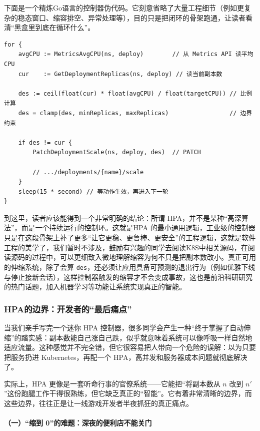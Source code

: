 下面是一个精炼Go语言的控制器伪代码。它刻意省略了大量工程细节（例如更复杂的稳态窗口、缩容排空、异常处理等），目的只是把闭环的骨架跑通，让读者看清“黑盒里到底在循环什么”。

\begin{verbatim}
for {
    avgCPU := MetricsAvgCPU(ns, deploy)        // 从 Metrics API 读平均 CPU
    cur    := GetDeploymentReplicas(ns, deploy) // 读当前副本数

    des := ceil(float(cur) * float(avgCPU) / float(targetCPU)) // 比例计算
    des = clamp(des, minReplicas, maxReplicas)                 // 边界约束

    if des != cur {
        PatchDeploymentScale(ns, deploy, des)  // PATCH 
        
        // .../deployments/{name}/scale
    }
    sleep(15 * second) // 等动作生效，再进入下一轮
}
\end{verbatim}

到这里，读者应该能得到一个非常明确的结论：所谓 HPA，并不是某种“高深算法”，而是一个持续运行的控制环。这就是HPA 的最小通用逻辑，工业级的控制器只是在这段骨架上补了更多“让它更稳、更鲁棒、更安全”的工程逻辑，这就是软件工程的美学了，我们暂时不涉及，鼓励有兴趣的同学去阅读K8S中相关源码，在阅读源码的过程中，可以更细致入微地理解缩容为何不只是把副本数改小。真正可用的伸缩系统，除了会算 \texttt{des}，还必须让应用具备可预测的退出行为（例如优雅下线与停止接新会话），这样控制器触发的缩容才不会变成事故，这也是前沿科研研究的热门话题，加入机器学习等功能让系统实现真正的智能。

\subsubsection{HPA的边界：开发者的“最后痛点”}

当我们亲手写完一个迷你 HPA 控制器，很多同学会产生一种“终于掌握了自动伸缩”的踏实感：副本数能自己涨自己跌，似乎就意味着系统可以像呼吸一样自然地适应流量。这种感觉并不完全错，但它很容易把人带向一个危险的误解：以为只要把服务扔进 Kubernetes，再配一个 HPA，高并发和服务器成本问题就彻底解决了。

实际上，HPA 更像是一套听命行事的官僚系统——它能把“将副本数从 $n$ 改到 $n'$”这份跑腿工作干得很熟练，但它缺乏真正的“智能”。它有着非常清晰的边界，而这些边界，往往正是让一线游戏开发者半夜抓狂的真正痛点。

\paragraph{（一）“缩到 0”的难题：深夜的便利店不能关门}

